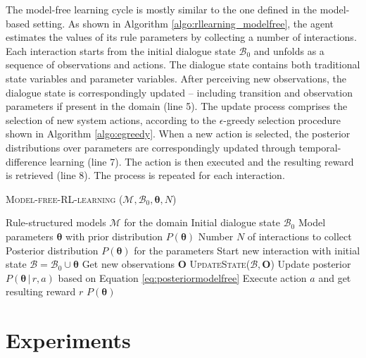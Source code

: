 The model-free learning cycle is mostly similar to the one defined in the model-based setting.  As shown in Algorithm \ref{algo:rllearning_modelfree}, the agent estimates the values of its rule parameters by collecting a number of interactions.  Each interaction starts from the initial dialogue state $\mathcal{B}_0$ and unfolds as a sequence of observations and actions.  The dialogue state contains both traditional state variables and parameter variables.  After perceiving new observations, the dialogue state is correspondingly updated -- including transition and observation parameters if present in the domain (line 5).  The update process comprises the selection of new system actions, according to the $\epsilon$-greedy selection procedure shown in Algorithm \ref{algo:egreedy}. When a new action is selected, the posterior distributions over parameters are correspondingly updated through temporal-difference learning (line 7). The action is then executed and the resulting reward is retrieved (line 8).  The process is repeated for each interaction. 


\begin{algorithm}[h]
\caption{\textsc{Model-free-RL-learning} ($\mathcal{M}, \mathcal{B}_0, \boldsymbol\theta, N$)}
\begin{algorithmic}[1]\vspace{1mm}
\REQUIRE Rule-structured models $\mathcal{M}$ for the domain
\REQUIRE Initial dialogue state $\mathcal{B}_0$
\REQUIRE Model parameters $\boldsymbol\theta$ with prior distribution $P(\boldsymbol\theta)$
\REQUIRE Number $N$ of interactions to collect
\ENSURE Posterior distribution $P(\boldsymbol\theta)$ for the parameters  \vspace{1mm}
\STATE Start new interaction with initial state $\mathcal{B} = \mathcal{B}_0 \cup \boldsymbol\theta $
\STATE Get new observations $\mathbf{O}$
\STATE \textsc{UpdateState}($\mathcal{B}, \mathbf{O}$)
\STATE Update posterior $P(\boldsymbol\theta \, | \, r, a)$ based on Equation \eqref{eq:posteriormodelfree}
\STATE Execute action $a$ and get resulting reward $r$
\ENDIF
\ENDWHILE
\ENDFOR
\RETURN $P(\boldsymbol\theta)$
\end{algorithmic} 
\label{algo:rllearning_modelfree}
\end{algorithm}


\section{Experiments}
\label{sec:rllearning-experiments}

